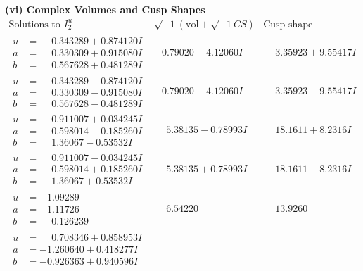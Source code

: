 \documentclass[1p]{elsarticle_modified}
\theoremstyle{definition}
\newcommand{\I}{\sqrt{-1}}
\begin{document}
\newpage\flushleft \textbf{(vi) Complex Volumes and Cusp Shapes}
$$\begin{array}{c|c|c}  
\text{Solutions to }I^u_{2}& \I (\text{vol} + \sqrt{-1}CS) & \text{Cusp shape}\\
 \hline 
\begin{aligned}
u &= \phantom{-}0.343289 + 0.874120 I \\
a &= \phantom{-}0.330309 + 0.915080 I \\
b &= \phantom{-}0.567628 + 0.481289 I\end{aligned}
 & -0.79020 - 4.12060 I & \phantom{-}3.35923 + 9.55417 I \\ \hline\begin{aligned}
u &= \phantom{-}0.343289 - 0.874120 I \\
a &= \phantom{-}0.330309 - 0.915080 I \\
b &= \phantom{-}0.567628 - 0.481289 I\end{aligned}
 & -0.79020 + 4.12060 I & \phantom{-}3.35923 - 9.55417 I \\ \hline\begin{aligned}
u &= \phantom{-}0.911007 + 0.034245 I \\
a &= \phantom{-}0.598014 - 0.185260 I \\
b &= \phantom{-}1.36067 - 0.53532 I\end{aligned}
 & \phantom{-}5.38135 - 0.78993 I & \phantom{-}18.1611 + 8.2316 I \\ \hline\begin{aligned}
u &= \phantom{-}0.911007 - 0.034245 I \\
a &= \phantom{-}0.598014 + 0.185260 I \\
b &= \phantom{-}1.36067 + 0.53532 I\end{aligned}
 & \phantom{-}5.38135 + 0.78993 I & \phantom{-}18.1611 - 8.2316 I \\ \hline\begin{aligned}
u &= -1.09289\phantom{ +0.000000I} \\
a &= -1.11726\phantom{ +0.000000I} \\
b &= \phantom{-}0.126239\phantom{ +0.000000I}\end{aligned}
 & \phantom{-}6.54220\phantom{ +0.000000I} & \phantom{-}13.9260\phantom{ +0.000000I} \\ \hline\begin{aligned}
u &= \phantom{-}0.708346 + 0.858953 I \\
a &= -1.260640 + 0.418277 I \\
b &= -0.926363 + 0.940596 I\end{aligned}

\end{array}$$
\end{document}
